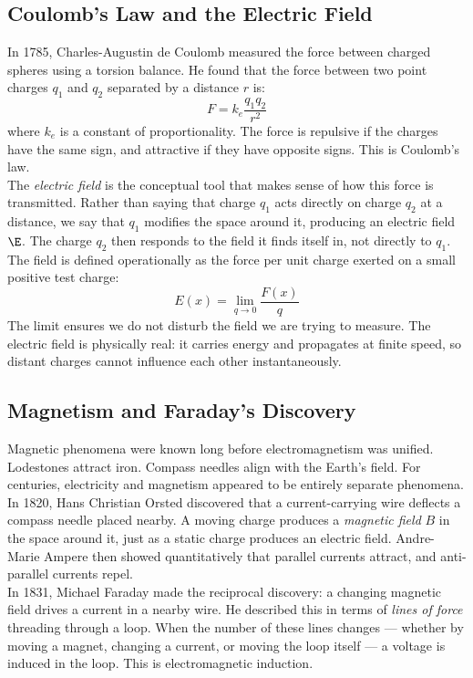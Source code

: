 \documentclass[a4paper]{article}
\begin{document}
\subsection*{Coulomb's Law and the Electric Field}
In 1785, Charles-Augustin de Coulomb measured the force between charged spheres using a torsion balance. He found that the force between two point charges $q_1$ and $q_2$ separated by a distance $r$ is: $$F=k_e\frac{q_1 q_2}{r^2}$$ where $k_e$ is a constant of proportionality. The force is repulsive if the charges have the same sign, and attractive if they have opposite signs. This is Coulomb's law. \\

The \textit{electric field} is the conceptual tool that makes sense of how this force is transmitted. Rather than saying that charge $q_1$ acts directly on charge $q_2$ at a distance, we say that $q_1$ modifies the space around it, producing an electric field $\E$. The charge $q_2$ then responds to the field it finds itself in, not directly to $q_1$. The field is defined operationally as the force per unit charge exerted on a small positive test charge: $$E(x)=\lim_{q \to 0}\frac{F(x)}{q}$$
The limit ensures we do not disturb the field we are trying to measure. The electric field is physically real: it carries energy and propagates at finite speed, so distant charges cannot influence each other instantaneously. 

\subsection*{Magnetism and Faraday's Discovery}
Magnetic phenomena were known long before electromagnetism was unified. Lodestones attract iron. Compass needles align with the Earth's field. For centuries, electricity and magnetism appeared to be entirely separate phenomena. \\

In 1820, Hans Christian Orsted discovered that a current-carrying wire deflects a compass needle placed nearby. A moving charge produces a \textit{magnetic field} $B$ in the space around it, just as a static charge produces an electric field. Andre-Marie Ampere then showed quantitatively that parallel currents attract, and anti-parallel currents repel. \\

In 1831, Michael Faraday made the reciprocal discovery: a changing magnetic field drives a current in a nearby wire. He described this in terms of \textit{lines of force} threading through a loop. When the number of these lines changes --- whether by moving a magnet, changing a current, or moving the loop itself --- a voltage is induced in the loop. This is electromagnetic induction. \\
\end{document}
